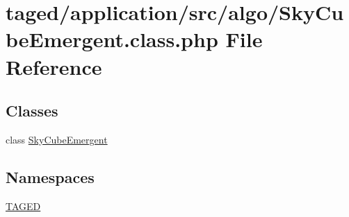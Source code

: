 \hypertarget{_sky_cube_emergent_8class_8php}{}\section{taged/application/src/algo/\+Sky\+Cube\+Emergent.class.\+php File Reference}
\label{_sky_cube_emergent_8class_8php}
\subsection*{Classes}
\begin{DoxyCompactItemize}
\item 
class \hyperlink{class_sky_cube_emergent}{Sky\+Cube\+Emergent}
\end{DoxyCompactItemize}
\subsection*{Namespaces}
\begin{DoxyCompactItemize}
\item 
 \hyperlink{namespace_t_a_g_e_d}{T\+A\+G\+ED}
\end{DoxyCompactItemize}
